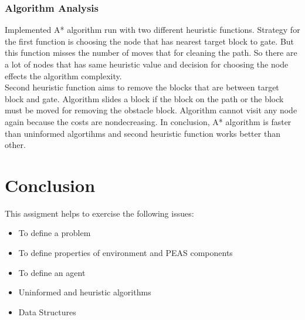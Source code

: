 \documentclass[a4paper,11pt]{report}
\begin{document}
\subsubsection*{Algorithm Analysis}

Implemented A* algorithm run with two different heuristic functions. Strategy for the first function is choosing 
the node that has nearest target block to gate. But this function misses the number of moves that for cleaning the path. 
So there are a lot of nodes that has same heuristic value and decision for choosing the node effects the algorithm complexity.\\
Second heuristic function aims to remove the blocks that are between target block and gate. Algorithm slides a block if the block on the path 
or the block must be moved for removing the obstacle block. Algorithm cannot visit any node again because the costs are nondecreasing. 
In conclusion, A* algorithm is faster than uninformed algortihms and second heuristic function works better than other.\\

\section*{Conclusion}

This assigment helps to exercise the following issues:\\

\begin{itemize}
 \item To define a problem
 \item To define properties of environment and PEAS components
 \item To define an agent
 \item Uninformed and heuristic algorithms
 \item Data Structures
\end{itemize}
\end{document}

